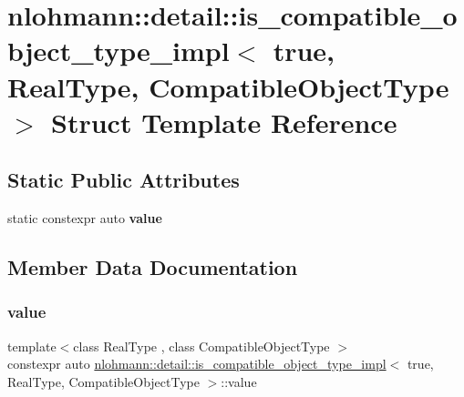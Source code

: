 \hypertarget{structnlohmann_1_1detail_1_1is__compatible__object__type__impl_3_01true_00_01RealType_00_01CompatibleObjectType_01_4}{}\section{nlohmann\+::detail\+::is\+\_\+compatible\+\_\+object\+\_\+type\+\_\+impl$<$ true, Real\+Type, Compatible\+Object\+Type $>$ Struct Template Reference}
\label{structnlohmann_1_1detail_1_1is__compatible__object__type__impl_3_01true_00_01RealType_00_01CompatibleObjectType_01_4}
\subsection*{Static Public Attributes}
\begin{DoxyCompactItemize}
\item 
static constexpr auto {\bfseries value}
\end{DoxyCompactItemize}


\subsection{Member Data Documentation}
\mbox{\label{structnlohmann_1_1detail_1_1is__compatible__object__type__impl_3_01true_00_01RealType_00_01CompatibleObjectType_01_4_afa131fcd3a4fc1881dd350a04589e6cf}} 
\subsubsection{\texorpdfstring{value}{value}}
{\footnotesize\ttfamily template$<$class Real\+Type , class Compatible\+Object\+Type $>$ \\
constexpr auto \mbox{\hyperlink{structnlohmann_1_1detail_1_1is__compatible__object__type__impl}{nlohmann\+::detail\+::is\+\_\+compatible\+\_\+object\+\_\+type\+\_\+impl}}$<$ true, Real\+Type, Compatible\+Object\+Type $>$\+::value\hspace{0.3cm}{\ttfamily [static]}}

